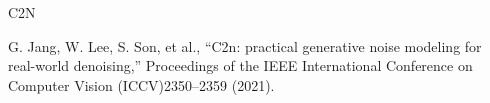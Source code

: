 C2N

G. Jang, W. Lee, S. Son, et al., “C2n: practical generative noise modeling for real-world denoising,” Proceedings of the IEEE International Conference on Computer Vision (ICCV)2350–2359 (2021).
